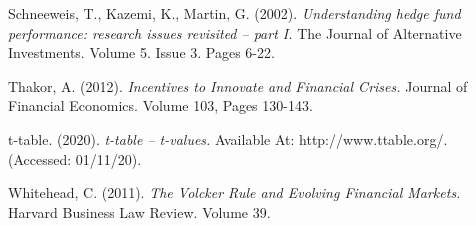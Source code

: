 \documentclass[11pt, english]{article}
\begin{document}
\begin{thebibliography}{9}
		Schneeweis, T., Kazemi, K., Martin, G. (2002).                   
                \textsl{Understanding hedge fund performance: research issues revisited – part I.}
		The Journal of Alternative Investments. Volume 5. Issue 3. Pages 6-22.
			
                Thakor, A. (2012).
                \textsl{Incentives to Innovate and Financial Crises.}
		Journal of Financial Economics. Volume 103, Pages 130-143.

                t-table. (2020).
                \textsl{t-table – t-values.}
		Available At:
		http://www.ttable.org/.
		(Accessed: 01/11/20).

                Whitehead, C. (2011). 
                \textsl{The Volcker Rule and Evolving Financial Markets.}
		Harvard Business Law Review. Volume 39.

\end{thebibliography}
\end{document}
